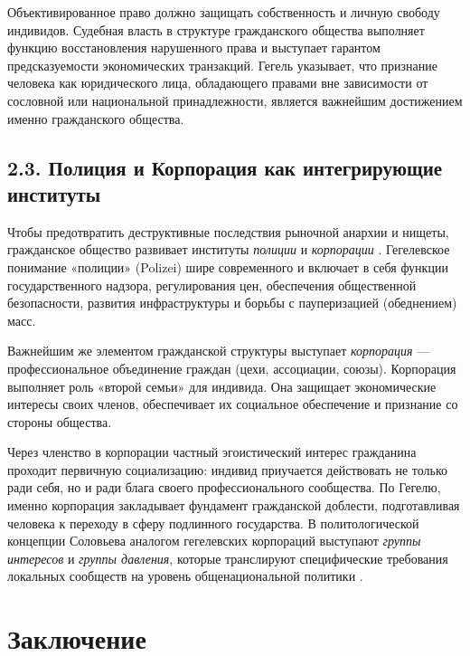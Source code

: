 Объективированное право должно защищать собственность и личную свободу индивидов. Судебная власть в структуре гражданского общества выполняет функцию восстановления нарушенного права и выступает гарантом предсказуемости экономических транзакций. Гегель указывает, что признание человека как юридического лица, обладающего правами вне зависимости от сословной или национальной принадлежности, является важнейшим достижением именно гражданского общества.

\subsection{2.3. Полиция и Корпорация как интегрирующие институты}
Чтобы предотвратить деструктивные последствия рыночной анархии и нищеты, гражданское общество развивает институты \textit{полиции} и \textit{корпорации} \cite{Hegel}. Гегелевское понимание «полиции» (Polizei) шире современного и включает в себя функции государственного надзора, регулирования цен, обеспечения общественной безопасности, развития инфраструктуры и борьбы с пауперизацией (обеднением) масс.

Важнейшим же элементом гражданской структуры выступает \textit{корпорация} — профессиональное объединение граждан (цехи, ассоциации, союзы). Корпорация выполняет роль «второй семьи» для индивида. Она защищает экономические интересы своих членов, обеспечивает их социальное обеспечение и признание со стороны общества. 

Через членство в корпорации частный эгоистический интерес гражданина проходит первичную социализацию: индивид приучается действовать не только ради себя, но и ради блага своего профессионального сообщества. По Гегелю, именно корпорация закладывает фундамент гражданской доблести, подготавливая человека к переходу в сферу подлинного государства. В политологической концепции Соловьева аналогом гегелевских корпораций выступают \textit{группы интересов} и \textit{группы давления}, которые транслируют специфические требования локальных сообществ на уровень общенациональной политики \cite{Solovyev}.

\newpage

\section*{Заключение}

